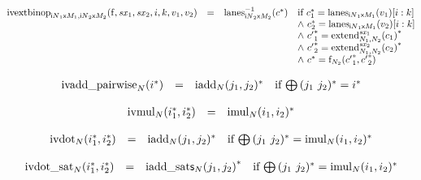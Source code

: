 $$
\begin{array}[t]{@{}lcl@{}l@{}}
{{\mathrm{ivextbinop}}}_{{{{\mathsf{i}}{N}}_1}{\mathsf{x}}{M_1}, {{{\mathsf{i}}{N}}_2}{\mathsf{x}}{M_2}}({\mathrm{f}}, {\mathit{sx}}_1, {\mathit{sx}}_2, i, k, v_1, v_2) & = & {{{{\mathrm{lanes}}}_{{{{\mathsf{i}}{N}}_2}{\mathsf{x}}{M_2}}^{{-1}}}}{({c^\ast})} & \quad
\begin{array}[t]{@{}l@{}}
\mbox{if}~ {c_1^\ast} = {{\mathrm{lanes}}}_{{{{\mathsf{i}}{N}}_1}{\mathsf{x}}{M_1}}(v_1){}[i : k] \\
{\land}~ {c_2^\ast} = {{\mathrm{lanes}}}_{{{{\mathsf{i}}{N}}_1}{\mathsf{x}}{M_1}}(v_2){}[i : k] \\
{\land}~ {{c'}_1^\ast} = {{{{{\mathrm{extend}}}_{N_1, N_2}^{{\mathit{sx}}_1}}}{(c_1)}^\ast} \\
{\land}~ {{c'}_2^\ast} = {{{{{\mathrm{extend}}}_{N_1, N_2}^{{\mathit{sx}}_2}}}{(c_2)}^\ast} \\
{\land}~ {c^\ast} = {{\mathrm{f}}}_{N_2}({{c'}_1^\ast}, {{c'}_2^\ast}) \\
\end{array} \\
\end{array}
$$

$$
\begin{array}[t]{@{}lcl@{}l@{}}
{{\mathrm{ivadd\_pairwise}}}_{N}({i^\ast}) & = & {{{\mathrm{iadd}}}_{N}(j_1, j_2)^\ast} & \quad \mbox{if}~ {\bigoplus}\, {(j_1~j_2)^\ast} = {i^\ast} \\
\end{array}
$$

$$
\begin{array}[t]{@{}lcl@{}l@{}}
{{\mathrm{ivmul}}}_{N}({i_1^\ast}, {i_2^\ast}) & = & {{{\mathrm{imul}}}_{N}(i_1, i_2)^\ast} \\
\end{array}
$$

$$
\begin{array}[t]{@{}lcl@{}l@{}}
{{\mathrm{ivdot}}}_{N}({i_1^\ast}, {i_2^\ast}) & = & {{{\mathrm{iadd}}}_{N}(j_1, j_2)^\ast} & \quad \mbox{if}~ {\bigoplus}\, {(j_1~j_2)^\ast} = {{{\mathrm{imul}}}_{N}(i_1, i_2)^\ast} \\
\end{array}
$$

$$
\begin{array}[t]{@{}lcl@{}l@{}}
{{\mathrm{ivdot\_sat}}}_{N}({i_1^\ast}, {i_2^\ast}) & = & {{{\mathrm{iadd\_sat}}}{\mathsf{s}}{{}_{N}(j_1, j_2)}^\ast} & \quad \mbox{if}~ {\bigoplus}\, {(j_1~j_2)^\ast} = {{{\mathrm{imul}}}_{N}(i_1, i_2)^\ast} \\
\end{array}
$$

